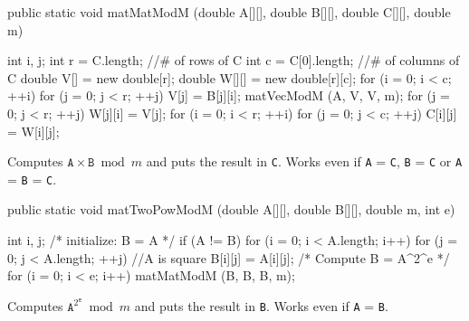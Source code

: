 \begin{code}

   public static void matMatModM (double A[][], double B[][], double C[][],
                                  double m) \begin{hide} {
      int i, j;
      int r = C.length;    //# of rows of C
      int c = C[0].length; //# of columns of C
      double V[] = new double[r];
      double W[][] = new double[r][c];
      for (i = 0; i < c;  ++i) {
         for (j = 0; j < r;  ++j)
            V[j] = B[j][i];
         matVecModM (A, V, V, m);
         for (j = 0; j < r;  ++j)
            W[j][i] = V[j];
      }
      for (i = 0; i < r;  ++i) {
         for (j = 0; j < c;  ++j)
            C[i][j] = W[i][j];
      }
   } \end{hide}
\end{code}
\begin{tabb} Computes $\mathtt{A} \times \mathtt{B} \bmod m$ 
  and puts the result in
  \texttt{C}. Works even if \texttt{A} = \texttt{C}, \texttt{B} = \texttt{C} or
  \texttt{A} = \texttt{B} = \texttt{C}.
\end{tabb}
\begin{htmlonly}
\end{htmlonly}
\begin{code}  

   public static void matTwoPowModM (double A[][], double B[][], double m,
                                     int e) \begin{hide} {
      int i, j;
      /* initialize: B = A */
      if (A != B) {
         for (i = 0; i < A.length; i++) {
            for (j = 0; j < A.length;  ++j)  //A is square
               B[i][j] = A[i][j];
         }
      }
      /* Compute B = A^{2^e} */
      for (i = 0; i < e; i++)
         matMatModM (B, B, B, m);
   } \end{hide}
\end{code}
\begin{tabb} Computes $\mathtt{A}^{2^{\mathtt{e}}} \bmod m$ and 
  puts the result in \texttt{B}.
  Works even if \texttt{A} = \texttt{B}.
\end{tabb}
\begin{htmlonly}
\end{htmlonly}
